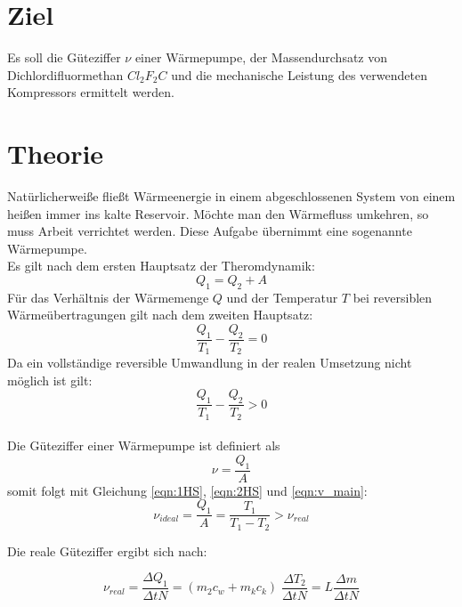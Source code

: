  \section*{Ziel}
    Es soll die Güteziffer $\nu$ einer Wärmepumpe, der Massendurchsatz 
    von Dichlordifluormethan $Cl_2F_2C$ und die mechanische Leistung des verwendeten
    Kompressors ermittelt werden.
\section{Theorie}  
\label{sec:theorie}
    Natürlicherweiße fließt Wärmeenergie in einem abgeschlossenen
    System von einem heißen immer ins kalte Reservoir.
    Möchte man den Wärmefluss umkehren, so muss Arbeit verrichtet werden.
    Diese Aufgabe übernimmt eine sogenannte Wärmepumpe.\\
    Es gilt nach dem ersten Hauptsatz der Theromdynamik:
    \begin{equation}
        Q_1=Q_2+A
        \label{eqn:1HS}
    \end{equation}
    Für das Verhältnis der Wärmemenge $Q$ und der Temperatur $T$ bei reversiblen
    Wärmeübertragungen gilt nach dem zweiten Hauptsatz:
    \begin{equation}
        \frac{Q_1}{T_1}-\frac{Q_2}{T_2}=0
        \label{eqn:2HS}
    \end{equation}
    Da ein vollständige reversible Umwandlung in der realen Umsetzung 
    nicht möglich ist gilt:
    \begin{equation*}
        \frac{Q_1}{T_1}-\frac{Q_2}{T_2}>0
    \end{equation*}\\

    Die Güteziffer einer Wärmepumpe ist definiert als 
    \begin{equation}
        \nu=\frac{Q_1}{A}
        \label{eqn:v_main}
    \end{equation}
    somit folgt mit Gleichung \eqref{eqn:1HS}, \eqref{eqn:2HS} und \eqref{eqn:v_main}:
    \begin{equation}
        \nu_{ideal}=\frac{Q_1}{A}=\frac{T_1}{T_1-T_2}>\nu_{real}
        \label{eqn:nu_ideal}
    \end{equation}

Die reale Güteziffer ergibt sich nach:
    
    \begin{equation}
        \nu_{real}=\frac{\Delta Q_1}{\Delta tN}=(m_2c_w + m_kc_k)\;\frac{\Delta T_2}{\Delta tN}=L\frac{\Delta m}{\Delta tN}     
    \end{equation}
        
